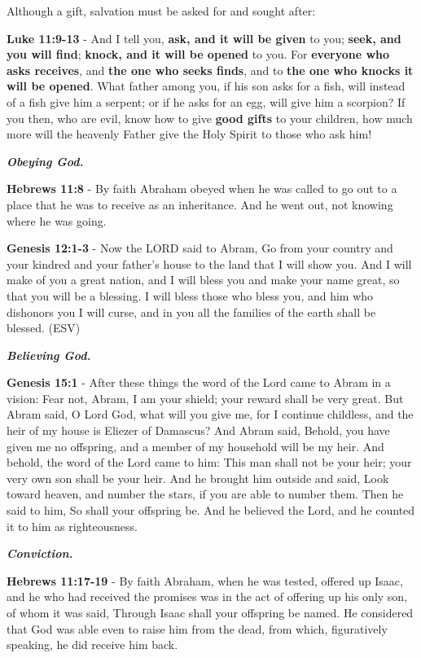 \documentclass[11pt]{article}
\begin{document}
Although a gift, salvation must be asked for and sought after:

\textbf{Luke 11:9-13} - And I tell you, \textbf{ask, and it will be given} to you; \textbf{seek, and you will find}; \textbf{knock, and it will be opened} to you.  For \textbf{everyone who asks receives}, and \textbf{the one who seeks finds}, and to \textbf{the one who knocks it will be opened}.  What father among you, if his son asks for a fish, will instead of a fish give him a serpent; or if he asks for an egg, will give him a scorpion?  If you then, who are evil, know how to give \textbf{good gifts} to your children, how much more will the heavenly Father give the Holy Spirit to those who ask him!

\emph{\textbf{Obeying God.}}

\textbf{Hebrews 11:8} - By faith Abraham obeyed when he was called to go out to a place that he was to receive as an inheritance. And he went out, not knowing where he was going.

\textbf{Genesis 12:1-3} - Now the LORD said to Abram, Go from your country and your kindred and your father's house to the land that I will show you. And I will make of you a great nation, and I will bless you and make your name great, so that you will be a blessing. I will bless those who bless you, and him who dishonors you I will curse, and in you all the families of the earth shall be blessed. (ESV)

\emph{\textbf{Believing God.}}

\textbf{Genesis 15:1} - After these things the word of the Lord came to Abram in a vision: Fear not, Abram, I am your shield; your reward shall be very great. But Abram said, O Lord God, what will you give me, for I continue childless, and the heir of my house is Eliezer of Damascus? And Abram said, Behold, you have given me no offspring, and a member of my household will be my heir. And behold, the word of the Lord came to him: This man shall not be your heir; your very own son shall be your heir. And he brought him outside and said, Look toward heaven, and number the stars, if you are able to number them. Then he said to him, So shall your offspring be. And he believed the Lord, and he counted it to him as righteousness.

\emph{\textbf{Conviction.}}

\textbf{Hebrews 11:17-19} - By faith Abraham, when he was tested, offered up Isaac, and he who had received the promises was in the act of offering up his only son, of whom it was said, Through Isaac shall your offspring be named. He considered that God was able even to raise him from the dead, from which, figuratively speaking, he did receive him back.
\end{document}
